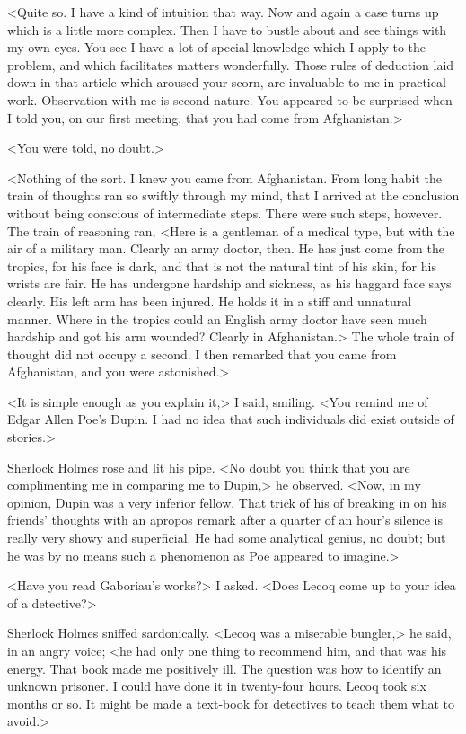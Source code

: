 <Quite so. I have a kind of intuition that way. Now and again a case turns up which is a little more complex. Then I have to bustle about and see things with my own eyes. You see I have a lot of special knowledge which I apply to the problem, and which facilitates matters wonderfully. Those rules of deduction laid down in that article which aroused your scorn, are invaluable to me in practical work. Observation with me is second nature. You appeared to be surprised when I told you, on our first meeting, that you had come from Afghanistan.>

<You were told, no doubt.>

<Nothing of the sort. I knew you came from Afghanistan. From long habit the train of thoughts ran so swiftly through my mind, that I arrived at the conclusion without being conscious of intermediate steps. There were such steps, however. The train of reasoning ran, <Here is a gentleman of a medical type, but with the air of a military man. Clearly an army doctor, then. He has just come from the tropics, for his face is dark, and that is not the natural tint of his skin, for his wrists are fair. He has undergone hardship and sickness, as his haggard face says clearly. His left arm has been injured. He holds it in a stiff and unnatural manner. Where in the tropics could an English army doctor have seen much hardship and got his arm wounded? Clearly in Afghanistan.> The whole train of thought did not occupy a second. I then remarked that you came from Afghanistan, and you were astonished.>

<It is simple enough as you explain it,> I said, smiling. <You remind me of Edgar Allen Poe's Dupin. I had no idea that such individuals did exist outside of stories.>

Sherlock Holmes rose and lit his pipe. <No doubt you think that you are complimenting me in comparing me to Dupin,> he observed. <Now, in my opinion, Dupin was a very inferior fellow. That trick of his of breaking in on his friends' thoughts with an apropos remark after a quarter of an hour's silence is really very showy and superficial. He had some analytical genius, no doubt; but he was by no means such a phenomenon as Poe appeared to imagine.>

<Have you read Gaboriau's works?> I asked. <Does Lecoq come up to your idea of a detective?>

Sherlock Holmes sniffed sardonically. <Lecoq was a miserable bungler,> he said, in an angry voice; <he had only one thing to recommend him, and that was his energy. That book made me positively ill. The question was how to identify an unknown prisoner. I could have done it in twenty-four hours. Lecoq took six months or so. It might be made a text-book for detectives to teach them what to avoid.>

